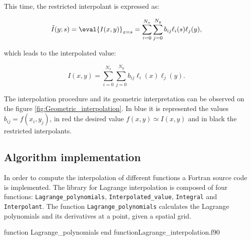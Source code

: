      This time, the restricted interpolant is expressed as:
     
     \begin{equation}
     \tilde{I}(y;s) = \eval{I(x,y)}_{x=s} =\sum_{i=0}^{N_x} \sum_{j=0}^{N_y} b_{ij} \ell_i(s) \ell_j(y) ,
     \end{equation}
     
     which leads to the interpolated value:
     
     \begin{equation}
     {I}(x,y) = \sum_{i=0}^{N_x} \sum_{j=0}^{N_y} b_{ij} \ell_i(x) \ell_j(y) .
     \end{equation}
     
     The interpolation procedure and its geometric interpretation can be observed on the figure \ref{fig:Geometric_interpolation}. In blue it is represented the values $b_{ij}=f(x_i,y_j)$, in red the desired value $f(x,y)\simeq I(x,y)$ and in black the restricted interpolants.
     
     
     \newpage
     \subsection{Algorithm implementation}
     In order to compute the interpolation of different functions a Fortran source code is implemented. The library for Lagrange interpolation is composed of four functions:
     \texttt{Lagrange\_polynomials}, \texttt{Interpolated\_value}, \texttt{Integral} and \texttt{Interpolant}.
     \newpage
     The function \texttt{Lagrange\_polynomials} calculates the Lagrange polynomials and its derivatives at a point, given a spatial grid. 
     
     \vspace{0.5cm} 
     {function Lagrange_polynomials}
     {end function}{Lagrange_interpolation.f90}
     
